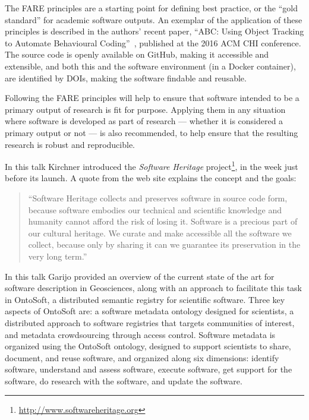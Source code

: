 \documentclass[a4paper,UKenglish]{dagrep}
\begin{document}
The FARE principles are a starting point for defining best practice, or the ``gold standard'' for academic software outputs. An exemplar of the application of these principles is described in the authors' recent paper, ``ABC: Using Object Tracking to Automate Behavioural Coding''~\cite{apaolaza_2016}, published at the 2016 ACM CHI conference. The source code is openly available on GitHub, making it accessible and extensible, and both this and the software environment (in a Docker container), are identified by DOIs, making the software findable and reusable.

Following the FARE principles will help to ensure that software intended to be a primary output of research is fit for purpose. Applying them in any situation where software is developed as part of research --- whether it is considered a primary output or not --- is also recommended, to help ensure that the resulting research is robust and reproducible.


In this talk Kirchner introduced the \emph{Software Heritage} project\footnote{\url{http://www.softwareheritage.org}}, in the week just before its launch.
A quote from the web site explains the concept and the goals:
\begin{quote}
``Software Heritage collects and preserves software in source code form, because software embodies our technical and scientific knowledge and humanity cannot afford the risk of losing it.
Software is a precious part of our cultural heritage. We curate and make accessible all the software we collect, because only by sharing it can we guarantee its preservation in the very long term.''
\end{quote}


In this talk Garijo provided an overview of the current state of the art for software description in Geosciences, along with an approach to facilitate this task in OntoSoft, a distributed semantic registry for scientific software. Three key aspects of OntoSoft are: a software metadata ontology designed for scientists, a distributed approach to software registries that targets communities of interest, and metadata crowdsourcing through access control. Software metadata is organized using the OntoSoft ontology, designed to support scientists to share, document, and reuse software, and organized along six dimensions: identify software, understand and assess software, execute software, get support for the software, do research with the software, and update the software.
\end{document}
